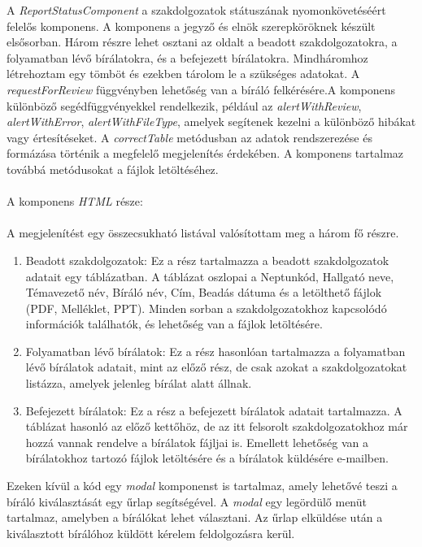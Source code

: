 A \textit{ReportStatusComponent} a szakdolgozatok státuszának nyomonkövetéséért felelős komponens. A komponens a jegyző és elnök szerepköröknek készült elsősorban. Három részre lehet osztani az oldalt a beadott szakdolgozatokra, a folyamatban lévő bírálatokra, és a befejezett bírálatokra. Mindháromhoz létrehoztam egy tömböt és ezekben tárolom le a szükséges adatokat. A \textit{requestForReview} függvényben lehetőség van a bíráló felkérésére.A komponens különböző segédfüggvényekkel rendelkezik, például az \textit{alertWithReview}, \textit{alertWithError}, \textit{alertWithFileType}, amelyek segítenek kezelni a különböző hibákat vagy értesítéseket. A \textit{correctTable} metódusban az adatok rendszerezése és formázása történik a megfelelő megjelenítés érdekében. A komponens tartalmaz továbbá metódusokat a fájlok letöltéséhez.\\
\\
A komponens \textit{HTML} része:\\
\\
A megjelenítést egy összecsukható listával valósítottam meg a három fő részre.
\\
\begin{enumerate}

\item{} Beadott szakdolgozatok: Ez a rész tartalmazza a beadott szakdolgozatok adatait egy táblázatban. A táblázat oszlopai a Neptunkód, Hallgató neve, Témavezető név, Bíráló név, Cím, Beadás dátuma és a letölthető fájlok (PDF, Melléklet, PPT). Minden sorban a szakdolgozatokhoz kapcsolódó információk találhatók, és lehetőség van a fájlok letöltésére.

\item{} Folyamatban lévő bírálatok: Ez a rész hasonlóan tartalmazza a folyamatban lévő bírálatok adatait, mint az előző rész, de csak azokat a szakdolgozatokat listázza, amelyek jelenleg bírálat alatt állnak.

\item{} Befejezett bírálatok: Ez a rész a befejezett bírálatok adatait tartalmazza. A táblázat hasonló az előző kettőhöz, de az itt felsorolt szakdolgozatokhoz már hozzá vannak rendelve a bírálatok fájljai is. Emellett lehetőség van a bírálatokhoz tartozó fájlok letöltésére és a bírálatok küldésére e-mailben.\\
\end{enumerate}
Ezeken kívül a kód egy \textit{modal} komponenst is tartalmaz, amely lehetővé teszi a bíráló kiválasztását egy űrlap segítségével. A \textit{modal} egy legördülő menüt tartalmaz, amelyben a bírálókat lehet választani. Az űrlap elküldése után a kiválasztott bírálóhoz küldött kérelem feldolgozásra kerül.

